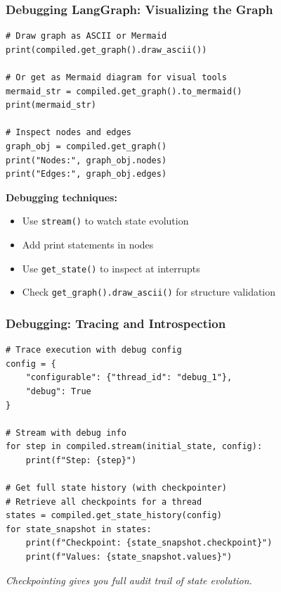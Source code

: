 \documentclass[aspectratio=169,11pt]{beamer}
\begin{document}
\begin{frame}[fragile]
\frametitle{Debugging LangGraph: Visualizing the Graph}
\begin{lstlisting}
# Draw graph as ASCII or Mermaid
print(compiled.get_graph().draw_ascii())

# Or get as Mermaid diagram for visual tools
mermaid_str = compiled.get_graph().to_mermaid()
print(mermaid_str)

# Inspect nodes and edges
graph_obj = compiled.get_graph()
print("Nodes:", graph_obj.nodes)
print("Edges:", graph_obj.edges)
\end{lstlisting}

\vspace{10pt}
\textbf{Debugging techniques:}
\begin{itemize}
    \setlength{\itemsep}{1pt}
  \item Use \texttt{stream()} to watch state evolution
  \item Add print statements in nodes
  \item Use \texttt{get\_state()} to inspect at interrupts
  \item Check \texttt{get\_graph().draw\_ascii()} for structure validation
\end{itemize}
\end{frame}

\begin{frame}[fragile]
\frametitle{Debugging: Tracing and Introspection}
\begin{lstlisting}
# Trace execution with debug config
config = {
    "configurable": {"thread_id": "debug_1"},
    "debug": True
}

# Stream with debug info
for step in compiled.stream(initial_state, config):
    print(f"Step: {step}")

# Get full state history (with checkpointer)
# Retrieve all checkpoints for a thread
states = compiled.get_state_history(config)
for state_snapshot in states:
    print(f"Checkpoint: {state_snapshot.checkpoint}")
    print(f"Values: {state_snapshot.values}")
\end{lstlisting}

\vspace{10pt}
\textit{Checkpointing gives you full audit trail of state evolution.}
\end{frame}
\end{document}
